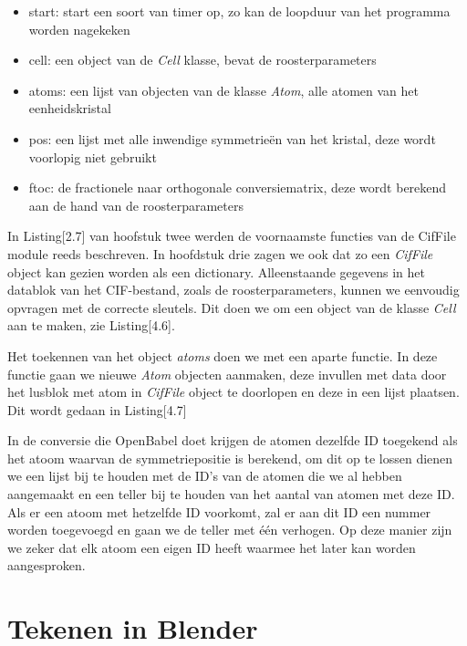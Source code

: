 \begin{itemize}
\item start: start een soort van timer op, zo kan de loopduur van het programma worden nagekeken
\item cell: een object van de \textit{Cell} klasse, bevat de roosterparameters
\item atoms: een lijst van objecten van de klasse \textit{Atom}, alle atomen van het eenheidskristal
\item pos: een lijst met alle inwendige symmetrieën van het kristal, deze wordt voorlopig niet gebruikt
\item ftoc: de fractionele naar orthogonale conversiematrix, deze wordt berekend aan de hand van de roosterparameters
\end{itemize}

In Listing[2.7] van hoofstuk twee werden de voornaamste functies van de CifFile module reeds beschreven. In hoofdstuk drie zagen we ook dat zo een \textit{CifFile} object kan gezien worden als een dictionary. Alleenstaande gegevens in het datablok van het CIF-bestand, zoals de roosterparameters, kunnen we eenvoudig opvragen met de correcte sleutels. Dit doen we om een object van de klasse \textit{Cell} aan te maken, zie Listing[4.6].



Het toekennen van het object \textit{atoms} doen we met een aparte functie. In deze functie gaan we nieuwe \textit{Atom} objecten aanmaken, deze invullen met data door het lusblok met atom in \textit{CifFile} object te doorlopen en deze in een lijst plaatsen. Dit wordt gedaan in Listing[4.7] 



In de conversie die OpenBabel doet krijgen de atomen dezelfde ID toegekend als het atoom waarvan de symmetriepositie is berekend, om dit op te lossen dienen we een lijst bij te houden met de ID's van de atomen die we al hebben aangemaakt en een teller bij te houden van het aantal van atomen met deze ID. Als er een atoom met hetzelfde ID voorkomt, zal er aan dit ID een nummer worden toegevoegd en gaan we de teller met één verhogen. Op deze manier zijn we zeker dat elk atoom een eigen ID heeft waarmee het later kan worden aangesproken.    

\section{Tekenen in Blender}

